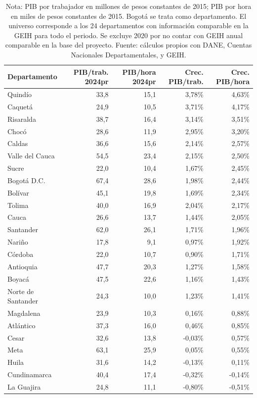 \begin{table}[H]
\centering
\caption{Productividad laboral por departamento, 2010--2024pr}
\label{tab:pib_geih_productividad_departamento}
\scriptsize
\begin{tabular}{lrrrr}
\toprule
Departamento & PIB/trab. 2024pr & PIB/hora 2024pr & Crec. PIB/trab. & Crec. PIB/hora \\
\midrule
Quindío & 33,8 & 15,1 & 3,78\% & 4,63\% \\
Caquetá & 24,9 & 10,5 & 3,71\% & 4,17\% \\
Risaralda & 38,7 & 16,4 & 3,14\% & 3,51\% \\
Chocó & 28,6 & 11,9 & 2,95\% & 3,20\% \\
Caldas & 36,6 & 15,6 & 2,14\% & 2,57\% \\
Valle del Cauca & 54,5 & 23,4 & 2,15\% & 2,50\% \\
Sucre & 22,0 & 10,4 & 1,67\% & 2,45\% \\
Bogotá D.C. & 67,4 & 28,6 & 1,98\% & 2,44\% \\
Bolívar & 45,1 & 19,8 & 1,69\% & 2,34\% \\
Tolima & 40,0 & 16,9 & 2,04\% & 2,17\% \\
Cauca & 26,6 & 13,7 & 1,44\% & 2,05\% \\
Santander & 62,0 & 26,1 & 1,71\% & 1,96\% \\
Nariño & 17,8 & 9,1 & 0,97\% & 1,92\% \\
Córdoba & 22,0 & 10,7 & 0,90\% & 1,71\% \\
Antioquia & 47,7 & 20,3 & 1,27\% & 1,58\% \\
Boyacá & 47,5 & 22,6 & 1,16\% & 1,43\% \\
Norte de Santander & 24,3 & 10,0 & 1,23\% & 1,41\% \\
Magdalena & 23,9 & 10,3 & 0,16\% & 0,88\% \\
Atlántico & 37,3 & 16,0 & 0,46\% & 0,85\% \\
Cesar & 32,6 & 13,8 & -0,03\% & 0,57\% \\
Meta & 63,1 & 25,9 & 0,05\% & 0,55\% \\
Huila & 31,6 & 14,2 & -0,13\% & 0,11\% \\
Cundinamarca & 40,4 & 17,4 & -0,32\% & -0,14\% \\
La Guajira & 24,8 & 11,1 & -0,80\% & -0,51\% \\
\bottomrule
\end{tabular}
\caption*{\footnotesize Nota: PIB por trabajador en millones de pesos constantes de 2015; PIB por hora en miles de pesos constantes de 2015. Bogotá se trata como departamento. El universo corresponde a los 24 departamentos con información comparable en la GEIH para todo el periodo. Se excluye 2020 por no contar con GEIH anual comparable en la base del proyecto. Fuente: cálculos propios con DANE, Cuentas Nacionales Departamentales, y GEIH.}
\end{table}